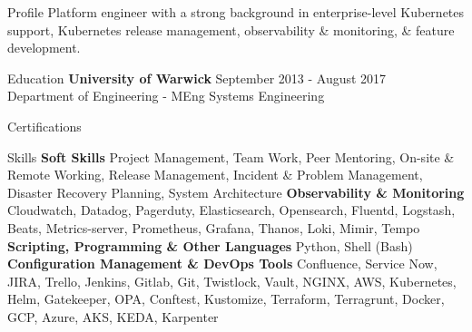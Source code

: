 \documentclass{resume} %
\newcommand{\tab}[1]{\hspace{.2667\textwidth}\rlap{#1}}
\newcommand{\itab}[1]{\hspace{0em}\rlap{#1}}
\begin{document}

\begin{rSection}{Profile}
\smallbreak
\normalfont Platform engineer with a strong background in enterprise-level Kubernetes support, Kubernetes release management, observability \& monitoring, \& feature development. \newline
\end{rSection}


\begin{rSection}{Education}
\smallbreak
{\bf University of Warwick} \hfill { September 2013 - August 2017}
\\ \normalfont Department of Engineering - MEng Systems Engineering
\end{rSection}

\begin{rSection}{Certifications}

\end{rSection}

\begin{rSection}{Skills}
\smallbreak
{\bf Soft Skills} \newline
Project Management, Team Work, Peer Mentoring, On-site \& Remote Working, Release Management, Incident \& Problem Management, Disaster Recovery Planning, System Architecture \newline
{\bf Observability \& Monitoring} \newline
Cloudwatch, Datadog, Pagerduty, Elasticsearch, Opensearch, Fluentd, Logstash, Beats, Metrics-server, Prometheus, Grafana, Thanos, Loki, Mimir, Tempo \newline
{\bf Scripting, Programming \& Other Languages} \newline
Python, Shell (Bash) \newline
{\bf Configuration Management \& DevOps Tools} \newline
Confluence, Service Now, JIRA, Trello, Jenkins, Gitlab, Git, Twistlock, Vault, NGINX, AWS, Kubernetes, Helm, Gatekeeper, OPA, Conftest, Kustomize, Terraform, Terragrunt, Docker, GCP, Azure, AKS, KEDA, Karpenter
\end{rSection}
\end{document}
